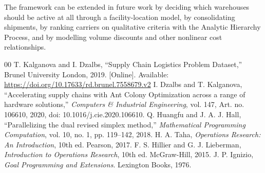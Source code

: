\documentclass[conference]{IEEEtran}
\begin{document}
The framework can be extended in future work by deciding which warehouses should be active at all through a facility-location model, by consolidating shipments, by ranking carriers on qualitative criteria with the Analytic Hierarchy Process, and by modelling volume discounts and other nonlinear cost relationships.

\begin{thebibliography}{00}
 T. Kalganova and I. Dzalbs, ``Supply Chain Logistics Problem Dataset,'' Brunel University London, 2019. [Online]. Available: \url{https://doi.org/10.17633/rd.brunel.7558679.v2}
 I. Dzalbs and T. Kalganova, ``Accelerating supply chains with Ant Colony Optimization across a range of hardware solutions,'' \textit{Computers \& Industrial Engineering}, vol. 147, Art. no. 106610, 2020, doi: 10.1016/j.cie.2020.106610.
 Q. Huangfu and J. A. J. Hall, ``Parallelizing the dual revised simplex method,'' \textit{Mathematical Programming Computation}, vol. 10, no. 1, pp. 119--142, 2018.
 H. A. Taha, \textit{Operations Research: An Introduction}, 10th ed. Pearson, 2017.
 F. S. Hillier and G. J. Lieberman, \textit{Introduction to Operations Research}, 10th ed. McGraw-Hill, 2015.
 J. P. Ignizio, \textit{Goal Programming and Extensions}. Lexington Books, 1976.
\end{thebibliography}
\end{document}
